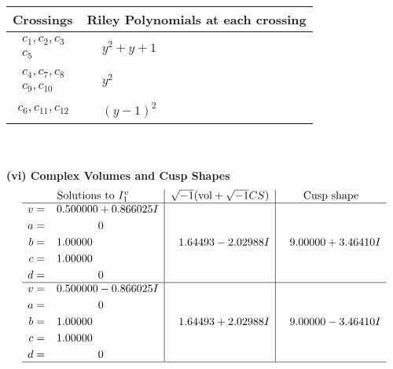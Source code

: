 \documentclass[1p]{elsarticle_modified}
\theoremstyle{definition}
\newcommand{\I}{\sqrt{-1}}
\begin{document}
\begin{tabular}{m{50pt}|m{274pt}}
Crossings & \hspace{64pt}Riley Polynomials at each crossing \\
\hline $$\begin{aligned}c_{1},c_{2},c_{3}\\c_{5}\end{aligned}$$&$\begin{aligned}
&y^2+y+1
\end{aligned}$\\
\hline $$\begin{aligned}c_{4},c_{7},c_{8}\\c_{9},c_{10}\end{aligned}$$&$\begin{aligned}
&y^2
\end{aligned}$\\
\hline $$\begin{aligned}c_{6},c_{11},c_{12}\end{aligned}$$&$\begin{aligned}
&(y-1)^2
\end{aligned}$\\
\hline
\end{tabular}\\~\\
\newpage\flushleft \textbf{(vi) Complex Volumes and Cusp Shapes}
$$\begin{array}{c|c|c}  
\text{Solutions to }I^v_{1}& \I (\text{vol} + \sqrt{-1}CS) & \text{Cusp shape}\\
 \hline 
\begin{aligned}
v &= \phantom{-}0.500000 + 0.866025 I \\
a &= \phantom{-0.000000 } 0 \\
b &= \phantom{-}1.00000\phantom{ +0.000000I} \\
c &= \phantom{-}1.00000\phantom{ +0.000000I} \\
d &= \phantom{-0.000000 } 0\end{aligned}
 & \phantom{-}1.64493 - 2.02988 I & \phantom{-}9.00000 + 3.46410 I \\ \hline\begin{aligned}
v &= \phantom{-}0.500000 - 0.866025 I \\
a &= \phantom{-0.000000 } 0 \\
b &= \phantom{-}1.00000\phantom{ +0.000000I} \\
c &= \phantom{-}1.00000\phantom{ +0.000000I} \\
d &= \phantom{-0.000000 } 0\end{aligned}
 & \phantom{-}1.64493 + 2.02988 I & \phantom{-}9.00000 - 3.46410 I\\
 \hline 
 \end{array}$$\newpage\newpage\renewcommand{\arraystretch}{1}
\end{document}
